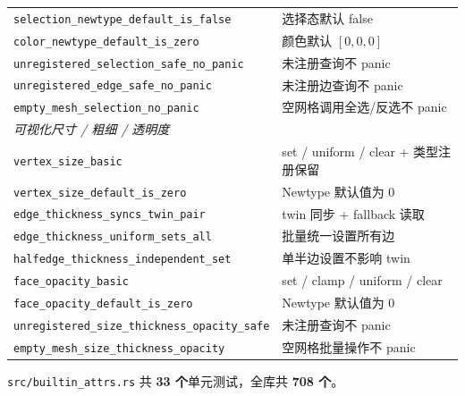 \documentclass[11pt,a4paper]{article}
\begin{document}
\begin{longtable}{@{}ll@{}}
  \texttt{selection\_newtype\_default\_is\_false}       & 选择态默认 false \\
  \texttt{color\_newtype\_default\_is\_zero}            & 颜色默认 $[0,0,0]$ \\
  \texttt{unregistered\_selection\_safe\_no\_panic}    & 未注册查询不 panic \\
  \texttt{unregistered\_edge\_safe\_no\_panic}          & 未注册边查询不 panic \\
  \texttt{empty\_mesh\_selection\_no\_panic}           & 空网格调用全选/反选不 panic \\
  \midrule
  \multicolumn{2}{l}{\textit{可视化尺寸 / 粗细 / 透明度}} \\
  \texttt{vertex\_size\_basic}                              & set / uniform / clear + 类型注册保留 \\
  \texttt{vertex\_size\_default\_is\_zero}                  & Newtype 默认值为 0 \\
  \texttt{edge\_thickness\_syncs\_twin\_pair}              & twin 同步 + fallback 读取 \\
  \texttt{edge\_thickness\_uniform\_sets\_all}             & 批量统一设置所有边 \\
  \texttt{halfedge\_thickness\_independent\_set}          & 单半边设置不影响 twin \\
  \texttt{face\_opacity\_basic}                            & set / clamp / uniform / clear \\
  \texttt{face\_opacity\_default\_is\_zero}                & Newtype 默认值为 0 \\
  \texttt{unregistered\_size\_thickness\_opacity\_safe} & 未注册查询不 panic \\
  \texttt{empty\_mesh\_size\_thickness\_opacity} & 空网格批量操作不 panic \\
  \bottomrule
\end{longtable}

\texttt{src/builtin\_attrs.rs} 共 \textbf{33 个}单元测试，全库共 \textbf{708 个}。
\end{document}
